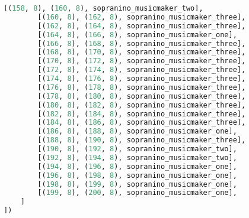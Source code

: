\begin{lstlisting}[language=Python, caption=Invocation Source Code]
        [(158, 8), (160, 8), sopranino_musicmaker_two],
        [(160, 8), (162, 8), sopranino_musicmaker_three],
        [(162, 8), (164, 8), sopranino_musicmaker_three],
        [(164, 8), (166, 8), sopranino_musicmaker_one],
        [(166, 8), (168, 8), sopranino_musicmaker_three],
        [(168, 8), (170, 8), sopranino_musicmaker_three],
        [(170, 8), (172, 8), sopranino_musicmaker_three],
        [(172, 8), (174, 8), sopranino_musicmaker_three],
        [(174, 8), (176, 8), sopranino_musicmaker_three],
        [(176, 8), (178, 8), sopranino_musicmaker_three],
        [(178, 8), (180, 8), sopranino_musicmaker_three],
        [(180, 8), (182, 8), sopranino_musicmaker_three],
        [(182, 8), (184, 8), sopranino_musicmaker_three],
        [(184, 8), (186, 8), sopranino_musicmaker_three],
        [(186, 8), (188, 8), sopranino_musicmaker_one],
        [(188, 8), (190, 8), sopranino_musicmaker_three],
        [(190, 8), (192, 8), sopranino_musicmaker_two],
        [(192, 8), (194, 8), sopranino_musicmaker_two],
        [(194, 8), (196, 8), sopranino_musicmaker_one],
        [(196, 8), (198, 8), sopranino_musicmaker_one],
        [(198, 8), (199, 8), sopranino_musicmaker_one],
        [(199, 8), (200, 8), sopranino_musicmaker_one],
    ]
])


\end{lstlisting}
